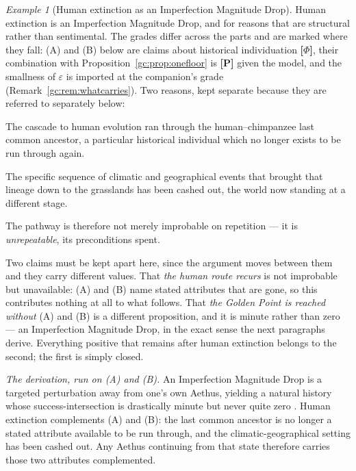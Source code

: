 \documentclass[11pt]{article}
\numberwithin{equation}{section}
\theoremstyle{plain}
\theoremstyle{definition}
\theoremstyle{remark}
\newtheorem{example}[theorem]{Example}
\begin{document}
\begin{example}[Human extinction as an Imperfection Magnitude Drop]
\label{gc:ex:humanIMD}
Human extinction is an Imperfection Magnitude Drop, and for reasons
that are structural rather than sentimental. The grades differ across
the parts and are marked where they fall: (A) and (B) below are claims
about historical individuation \textbf{[$\Phi$]}, their combination
with Proposition~\ref{gc:prop:onefloor} is \textbf{[P]} given the
model, and the smallness of $\varepsilon$ is imported at the
companion's grade (Remark~\ref{gc:rem:whatcarries}). Two reasons, kept
separate because they are referred to separately below:

\begin{description}\itemsep2pt
\item[\normalfont(A) \emph{The lineage is spent.}] The cascade to human
evolution ran through the human--chimpanzee last common ancestor, a
particular historical individual which no longer exists to be run
through again.
\item[\normalfont(B) \emph{The setting is spent.}] The specific sequence
of climatic and geographical events that brought that lineage down to
the grasslands has been cashed out, the world now standing at a
different stage.
\end{description}

\noindent The pathway is therefore not merely improbable on repetition
--- it is \emph{unrepeatable}, its preconditions spent.

Two claims must be kept apart here, since the argument moves between
them and they carry different values. That \emph{the human route
recurs} is not improbable but unavailable: (A) and (B) name stated
attributes that are gone, so this contributes nothing at all to what
follows. That \emph{the Golden Point is reached without} (A) and (B) is
a different proposition, and it is minute rather than zero --- an
Imperfection Magnitude Drop, in the exact sense the next paragraphs
derive. Everything positive that remains after human extinction belongs
to the second; the first is simply closed.

\emph{The derivation, run on (A) and (B).} An Imperfection Magnitude
Drop is a targeted perturbation away from one's own Aethus, yielding a
natural history whose success-intersection is drastically minute but
never quite zero \cite[\S IMD]{Nexus}. Human extinction complements (A)
and (B): the last common ancestor is no longer a stated attribute
available to be run through, and the climatic-geographical setting has
been cashed out. Any Aethus continuing from that state therefore
carries those two attributes complemented.


\end{example}
\end{document}

